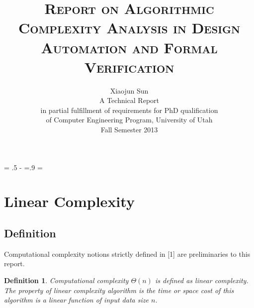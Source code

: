 \documentclass[11pt,twoside, onecolumn]{IEEEtran}
\newcommand{\ls}[1]
    {\dimen0=\fontdimen6\the\font
     \lineskip=#1\dimen0
     \advance\lineskip.5\fontdimen5\the\font
     \advance\lineskip-\dimen0
     \lineskiplimit=.9\lineskip
     \baselineskip=\lineskip
     \advance\baselineskip\dimen0
     \normallineskip\lineskip
     \normallineskiplimit\lineskiplimit
     \normalbaselineskip\baselineskip
     \ignorespaces
    }
\newtheorem{Definition}{Definition}[section]
\begin{document}

\ls{1.1}

\title{\large{\textsc{Report  on Algorithmic Complexity Analysis in Design Automation and Formal Verification}}}
\author{Xiaojun Sun\\
A Technical Report\\
in partial fulfillment of requirements for PhD qualification\\
of Computer Engineering Program, University of Utah\\
Fall Semester 2013
}

%
 
\maketitle

\newcommand{\Fq}{{\mathbb{F}}_{q}}
\newcommand{\Fkk}{{\mathbb{F}}_{2^k}}
\newcommand{\Fkkx}[1][x]{\ensuremath{\mathbb{F}}_{2^k}[#1]\xspace}
\newcommand{\Grobner}{Gr\"{o}bner\xspace}
\newcommand{\B}{{\mathbb{B}}}
\newcommand{\Z}{{\mathbb{Z}}}
\newcommand{\F}{{\mathcal{F}}}
\newcommand{\G}{{\mathcal{G}}}
\newcommand{\R}{\mathbb{R}}

\newcommand{\debug}[1]{\textcolor{gray}{[ #1 ]}}



\section{Linear Complexity}
\subsection{Definition}
Computational complexity notions strictly defined in [1] are preliminaries to this report.
\begin{Definition}
Computational complexity $\Theta(n)$ is defined as \emph{linear complexity}. The property of
linear complexity algorithm is the time or space cost of this algorithm is a linear function
of input data size $n$.
\end{Definition}
\end{document}
